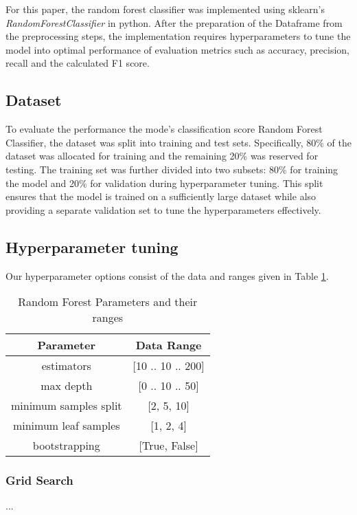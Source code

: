 \documentclass[11pt]{article}
\begin{document}
For this paper, the random forest classifier was implemented using sklearn's \textit{RandomForestClassifier} in python. After the preparation of the Dataframe from the preprocessing steps, the implementation requires hyperparameters to tune the model into optimal performance of evaluation metrics such as accuracy, precision, recall and the calculated F1 score.

\subsection{Dataset}
To evaluate the performance the mode's classification score Random Forest Classifier, the dataset was split into training and test sets. Specifically, 80\% of the dataset was allocated for training and the remaining 20\% was reserved for testing. The training set was further divided into two subsets: 80\% for training the model and 20\% for validation during hyperparameter tuning. This split ensures that the model is trained on a sufficiently large dataset while also providing a separate validation set to tune the hyperparameters effectively.

\subsection{Hyperparameter tuning}
Our hyperparameter options consist of the data and ranges given in Table \ref{tab:hyperparameter ranges}.

\begin{table}[h!]
    \centering
    \begin{tabular}{|c|c|}
        \hline
        Parameter & Data Range \\
        \hline
        estimators & [10 .. 10 .. 200] \\
        max depth & [0 .. 10 .. 50] \\
        minimum samples split & [2, 5, 10] \\
        minimum leaf samples & [1, 2, 4] \\
        bootstrapping & [True, False] \\
        \hline
    \end{tabular}
    \caption{Random Forest Parameters and their ranges}
    \label{tab:hyperparameter ranges}
\end{table}

\subsubsection{Grid Search}
... 
\end{document}
